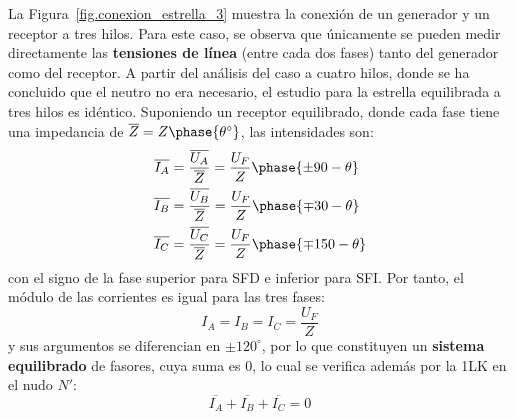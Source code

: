\documentclass[11pt]{book} %
\numberwithin{dummy}{section}
\theoremstyle{ocrenumbox}
\theoremstyle{blacknumex}
\theoremstyle{blacknumbox}
\theoremstyle{ocrenum}
\begin{document}
	La Figura~\ref{fig.conexion_estrella_3} muestra la conexión de un generador y un receptor a tres hilos. Para este caso, se observa que únicamente se pueden medir directamente las \textbf{tensiones de línea} (entre cada dos fases) tanto del generador como del receptor. A partir del análisis del caso a cuatro hilos, donde se ha concluido que el neutro no era necesario, el estudio para la estrella equilibrada a tres hilos es idéntico. Suponiendo un receptor equilibrado, donde cada fase tiene una impedancia de $\overline{Z}=Z\phase{\theta^\circ}$, las intensidades son:
	\begin{align*}
      \overline{I_A} &= \frac{\overline{U_A}}{\overline{Z}} = \frac{U_F}{Z}\phase{{\pm 90} - \theta} \\
      \overline{I_B} &= \frac{\overline{U_B}}{\overline{Z}} = \frac{U_F}{Z}\phase{{\mp 30} - \theta}\\
      \overline{I_C} &= \frac{\overline{U_C}}{\overline{Z}} = \frac{U_F}{Z}\phase{{\mp 150} - \theta}
    \end{align*}
    con el signo de la fase superior para SFD e inferior para SFI. Por tanto, el módulo de las corrientes es igual para las tres fases: 
    \begin{equation}
        \boxed{I_A = I_B = I_C = \dfrac{U_F}{Z}}
    \end{equation}
    y sus argumentos se diferencian en $\pm120^\circ$, por lo que constituyen un \textbf{sistema equilibrado} de fasores, cuya suma es 0, lo cual se verifica además por la 1LK en el nudo $N'$: 
    \begin{equation*}
        \overline{I_A}  + \overline{I_B} + \overline{I_C} = 0
    \end{equation*}
\end{document}

